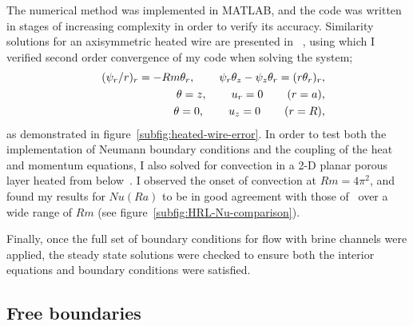 \documentclass[11pt]{proc}
\begin{document}
The numerical method was implemented in MATLAB, and the code was written in stages of increasing complexity in order to verify its accuracy. Similarity solutions for an axisymmetric heated wire are presented in ~\citet*[Chapter~5.9]{nield-bejan-06}, using which I verified second order convergence of my code when solving the system;
\begin{eqnarray}
&&(\psi_r/r)_r = -Rm \theta_r, \hspace{5ex} \psi_r \theta_z - \psi_z \theta_r = (r \theta_r)_r, \\
&&\theta = z, \hspace{5ex} u_r = 0 \hspace{5ex} (r=a), \\
&&\theta = 0, \hspace{5ex} u_z = 0 \hspace{5ex} (r=R),
\end{eqnarray}
as demonstrated in figure~\ref{subfig:heated-wire-error}. In order to test both the implementation of Neumann boundary conditions and the coupling of the heat and momentum equations, I also solved for convection in a 2-D planar porous layer heated from below~\citep*{horton-rogers-45,lapwood-48}. I observed the onset of convection at $Rm = 4 \pi^2$, and found my results for $Nu(Ra)$ to be in good agreement with those of~\citet*{caltagirone-75} over a wide range of $Rm$ (see figure~\ref{subfig:HRL-Nu-comparison}).

Finally, once the full set of boundary conditions for flow with brine channels were applied, the steady state solutions were checked to ensure both the interior equations and boundary conditions were satisfied.

\subsection{Free boundaries}
\label{sec:free-boundary-method}
\end{document}
